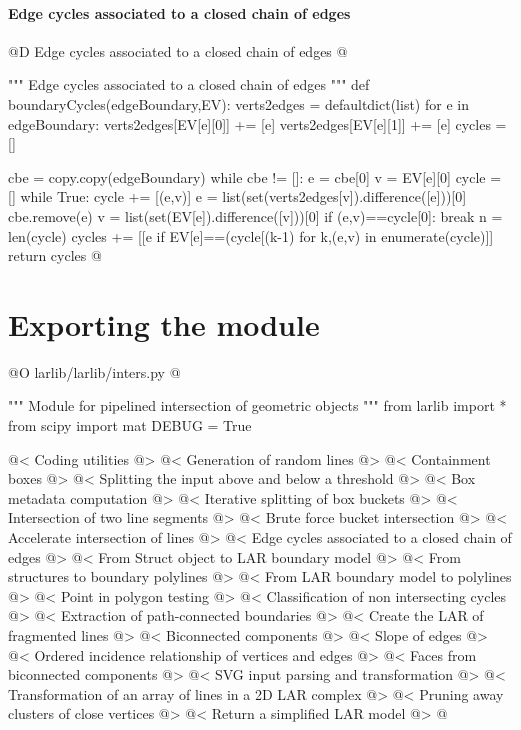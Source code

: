 \documentclass[11pt,oneside]{article}    %
\begin{document}
\paragraph{Edge cycles associated to a closed chain of edges}

@D Edge cycles associated to a closed chain of edges
@{""" Edge cycles associated to a closed chain of edges """
def boundaryCycles(edgeBoundary,EV):
    verts2edges = defaultdict(list)
    for e in edgeBoundary:
        verts2edges[EV[e][0]] += [e]
        verts2edges[EV[e][1]] += [e]
    cycles = []
    
    cbe = copy.copy(edgeBoundary)
    while cbe != []:
        e = cbe[0]
        v = EV[e][0]
        cycle = []
        while True:
            cycle += [(e,v)]
            e = list(set(verts2edges[v]).difference([e]))[0]
            cbe.remove(e)
            v = list(set(EV[e]).difference([v]))[0]
            if (e,v)==cycle[0]:
                break
        n = len(cycle)
        cycles += [[e if EV[e]==(cycle[(k-1)%
            for k,(e,v) in enumerate(cycle)]]
    return cycles
@}




\section{Exporting the module}

@O larlib/larlib/inters.py
@{""" Module for pipelined intersection of geometric objects """
from larlib import *
from scipy import mat
DEBUG = True

@< Coding utilities @>
@< Generation of random lines @>
@< Containment boxes @>
@< Splitting the input above and below a threshold @>
@< Box metadata computation @>
@< Iterative splitting of box buckets @>
@< Intersection of two line segments @>
@< Brute force bucket intersection @>
@< Accelerate intersection of lines @>
@< Edge cycles associated to a closed chain of edges @>
@< From Struct object to LAR boundary model @>
@< From structures to boundary polylines @>
@< From LAR boundary model to polylines @>
@< Point in polygon testing @>
@< Classification of non intersecting cycles @>
@< Extraction of path-connected boundaries @>
@< Create the LAR of fragmented lines @>
@< Biconnected components @>
@< Slope of edges @>
@< Ordered incidence relationship of vertices and edges @>
@< Faces from biconnected components @>
@< SVG input parsing and transformation @>
@< Transformation of an array of lines in a 2D LAR complex @>
@< Pruning away clusters of close vertices @>
@< Return a simplified LAR model @>
@}
\end{document}
